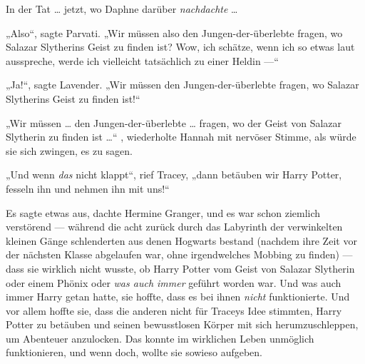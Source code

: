 In der Tat … jetzt, wo Daphne darüber \emph{nachdachte} …

„Also“, sagte Parvati.
„Wir müssen also den Jungen-der-überlebte fragen, wo Salazar Slytherins Geist zu finden ist? Wow, ich schätze, wenn ich so etwas laut ausspreche, werde ich vielleicht tatsächlich zu einer Heldin —“

„Ja!“, sagte Lavender.
„Wir müssen den Jungen-der-überlebte fragen, wo Salazar Slytherins Geist zu finden ist!“

„Wir müssen … den Jungen-der-überlebte … fragen, wo der Geist von Salazar Slytherin zu finden ist …“ , wiederholte Hannah mit nervöser Stimme, als würde sie sich zwingen, es zu sagen.

„Und wenn \emph{das} nicht klappt“, rief Tracey, „dann betäuben wir Harry Potter, fesseln ihn und nehmen ihn mit uns!“

\later

Es sagte etwas aus, dachte Hermine Granger, und es war schon ziemlich verstörend — während die acht zurück durch das Labyrinth der verwinkelten kleinen Gänge schlenderten aus denen Hogwarts bestand (nachdem ihre Zeit vor der nächsten Klasse abgelaufen war, ohne irgendwelches Mobbing zu finden) — dass sie wirklich nicht wusste, ob Harry Potter vom Geist von Salazar Slytherin oder einem Phönix oder \emph{was auch immer} geführt worden war. Und was auch immer Harry getan hatte, sie hoffte, dass es bei ihnen \emph{nicht} funktionierte. Und vor allem hoffte sie, dass die anderen nicht für Traceys Idee stimmten, Harry Potter zu betäuben und seinen bewusstlosen Körper mit sich herumzuschleppen, um Abenteuer anzulocken. Das konnte im wirklichen Leben unmöglich funktionieren, und wenn doch, wollte sie sowieso aufgeben.

